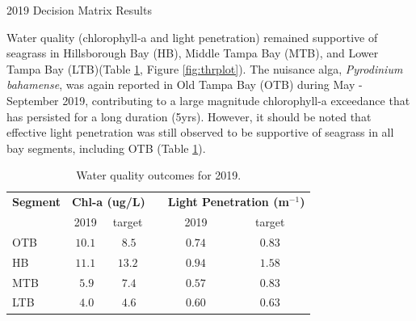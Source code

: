 \documentclass[final,t]{beamer}\usepackage[]{graphicx}\usepackage[]{color}
\begin{document}
\begin{frame}
\begin{columns}[t]
\begin{column}{.79\linewidth}
\begin{block}{2019 Decision Matrix Results}
\vspace{-0.1in}
\begin{minipage}{0.45\textwidth}
\footnotesize
Water quality (chlorophyll-a and light penetration) remained supportive of seagrass in Hillsborough Bay (HB), Middle Tampa Bay (MTB), and Lower Tampa Bay (LTB)(Table \ref{tab:segtab}, Figure \ref{fig:thrplot}). The nuisance alga, \textit{Pyrodinium bahamense}, was again reported in Old Tampa Bay (OTB) during May - September 2019, contributing to a large magnitude chlorophyll-a exceedance that has persisted for a long duration (5yrs). However, it should be noted that effective light penetration was still observed to be supportive of seagrass in all bay segments, including OTB (Table \ref{tab:segtab}).
\end{minipage}
\hspace{0.1in}
\begin{minipage}{0.5\textwidth}
\footnotesize
\begin{table}[!tbp]
\caption{{\footnotesize Water quality outcomes for 2019.}\label{tab:segtab}} 
\begin{center}
\begin{tabular}{lccccc}
\hline\hline
\multicolumn{1}{l}{\bfseries Segment}&\multicolumn{2}{c}{\bfseries Chl-a (ug/L)}&\multicolumn{1}{c}{\bfseries }&\multicolumn{2}{c}{\bfseries Light Penetration (m$^{-1}$)}\tabularnewline
\cline{2-3} \cline{5-6}
\multicolumn{1}{l}{}&\multicolumn{1}{c}{2019}&\multicolumn{1}{c}{target}&\multicolumn{1}{c}{}&\multicolumn{1}{c}{2019}&\multicolumn{1}{c}{target}\tabularnewline
\hline
\cellcolor{yellow}OTB&$10.1$&$~8.5$&&$0.74$&$0.83$\tabularnewline
\cellcolor{green}HB&$11.1$&$13.2$&&$0.94$&$1.58$\tabularnewline
\cellcolor{green}MTB&$~5.9$&$~7.4$&&$0.57$&$0.83$\tabularnewline
\cellcolor{green}LTB&$~4.0$&$~4.6$&&$0.60$&$0.63$\tabularnewline
\hline
\end{tabular}\end{center}
\end{table}

\end{minipage}

\end{block}

\vspace{-0.55in}


\end{column}
\end{columns}
\end{frame}
\end{document}
